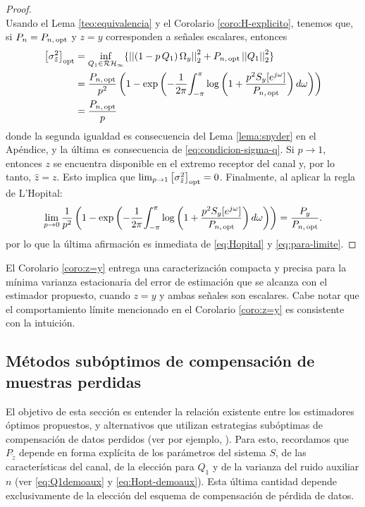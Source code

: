 \begin{proof}{\ \\}
Usando el Lema \ref{teo:equivalencia} y el Corolario \ref{coro:H-explicito}, tenemos que, si $P_n=P_{n,\,\operatorname{opt}}$ y $z=y$ corresponden a se\~nales escalares, entonces
\begin{align}
\left[ \sigma_{\tilde{z}}^2 \right]_{\operatorname{opt}} & = \inf_{ Q_1\in\mathcal{RH}_{\infty} } \lbrace \left| \left|  \left( 1 - p \, Q_1 \right) \Omega_y  \right| \right|_2^2 + P_{n, \, \operatorname{opt}} \left| \left|  Q_1  \right| \right|_2^2 \rbrace \nonumber \\
\label{eq:para-limite} & = \frac{P_{n, \, \operatorname{opt}} }{p^2} \left( 1 - \exp{ \left( - \frac{1}{2\pi}\!\int_{-\pi}^{\pi}  \log{ \left( 1 + \frac{p^2 S_y[e^{j\omega}]}{P_{n, \, \operatorname{opt}}} \right) } \,  d\omega  \right) } \right) \\
& = \frac{P_{n, \, \operatorname{opt}}}{p}
\end{align}
donde la segunda igualdad es consecuencia del Lema \ref{lema:snyder} en el Ap\'endice, y la \'ultima es consecuencia de \eqref{eq:condicion-sigma-q}. Si $p\rightarrow 1$, entonces $z$ se encuentra disponible en el extremo receptor del canal y, por lo tanto, $\hat{z}=z$. Esto implica que $\lim_{p\rightarrow 1}{\left[ \sigma_{\tilde{z}}^2 \right]_{\operatorname{opt}}}=0$. Finalmente, al aplicar la regla de L'Hopital:
\begin{align}\label{eq:Hopital}
\lim_{p\to 0} \frac{1}{p^2} \left( 1 - \exp{ \left( - \frac{1}{2\pi}\!\int_{-\pi}^{\pi}  \log{ \left( 1 + \frac{p^2 S_y[e^{j\omega}]}{P_{n, \, \operatorname{opt}}} \right) } \,  d\omega  \right) } \right)
= \frac{P_y}{P_{n, \, \operatorname{opt}}}.
\end{align}
por lo que la \'ultima afirmaci\'on es inmediata de \eqref{eq:Hopital} y \eqref{eq:para-limite}.
\QED
\end{proof}

El Corolario \ref{coro:z=y} entrega una caracterizaci\'on compacta y precisa para la m\'inima varianza estacionaria del error de estimaci\'on que se alcanza con el estimador propuesto, cuando $z=y$ y ambas se\~nales son escalares. Cabe notar que el comportamiento l\'imite mencionado en el Corolario \ref{coro:z=y} es consistente con la intuici\'on.

\subsection{M\'etodos sub\'optimos de compensaci\'on de muestras perdidas}\label{subsec:comparacion_mimo}
El objetivo de esta secci\'on es entender la relaci\'on existente entre los estimadores \'optimos propuestos, y alternativos que utilizan estrategias sub\'optimas de compensaci\'on de datos perdidos (ver por ejemplo, \cite{nahi69, tugnai81, hadsch79, costa94, sachsh07, suxixi08,lichpa10}). Para esto, recordamos que $P_{\tilde{z}}$ depende en forma expl\'icita de los par\'ametros del sistema $S$, de las caracter\'isticas del canal, de la elecci\'on para $Q_1$ y de la varianza del ruido auxiliar $n$ (ver \eqref{eq:Q1demoaux} y \eqref{eq:Hopt-demoaux}). Esta \'ultima cantidad depende exclusivamente de la elecci\'on del esquema de compensaci\'on de p\'erdida de datos.

